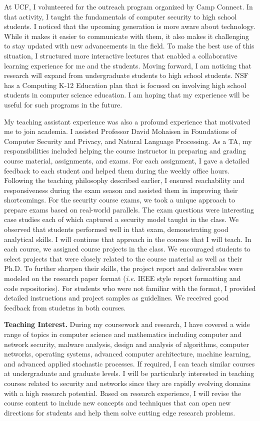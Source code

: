 \documentclass{NSF}
\newcommand{\BfPara}[1]{{\noindent\textbf{#1.}}\xspace}
\newcommand{\ie}{{\em i.e.}\xspace}
\begin{document}
At UCF, I volunteered for the outreach program organized by Camp Connect. In that activity, I taught the fundamentals of computer security to high school students. I noticed that the upcoming generation is more aware about technology. While it makes it easier to communicate with them, it also makes it challenging to stay updated with new advancements in the field. To make the best use of this situation, I structured more interactive lectures that enabled a collaborative learning experience for me and the students. Moving forward, I am noticing that research will expand from undergraduate students to high school students. NSF has a Computing K-12 Education plan that is focused on involving high school students in computer science education. I am hoping that my experience will be useful for such programs in the future. 


My teaching assistant experience was also a profound experience that motivated me to join academia. I assisted Professor David Mohaisen in Foundations of Computer Security and Privacy, and Natural Language Processing. As a TA, my responsibilities included helping the course instructor in preparing and grading course material, assignments, and exams. For each assignment, I gave a detailed feedback to each student and helped them during the weekly office hours. Following the teaching philosophy described earlier, I ensured reachability and responsiveness during the exam season and assisted them in improving their shortcomings. For the security course exams, we took a unique approach to prepare exams based on real-world parallels. The exam questions were interesting case studies each of which captured a security model taught in the class. We observed that students performed well in that exam, demonstrating good analytical skills. I will continue that approach in the courses that I will teach. In each course, we assigned course projects in the class. We encouraged students to select projects that were closely related to the course material as well as their Ph.D. To further sharpen their skills, the project report and deliverables were modeled on the research paper format (\ie IEEE style report formatting and code repositories). For students who were not familiar with the format, I provided detailed instructions and project samples as guidelines. We received good feedback from studetns in both courses. 



\vspace{2mm}
\BfPara{Teaching Interest} During my coursework and research, I have covered a wide range of topics in computer science and mathematics including computer and network security, malware analysis, design and analysis of algorithms, computer networks, operating systems, advanced computer architecture, machine learning, and advanced applied stochastic processes. If required, I can teach similar courses at undergraduate and graduate levels. I will be particularly interested in teaching courses related to security and networks since they are rapidly evolving domains with a high research potential. Based on research experience, I will revise the course content to include new concepts and techniques that can open new directions for students and help them solve cutting edge research problems. 
\end{document}
